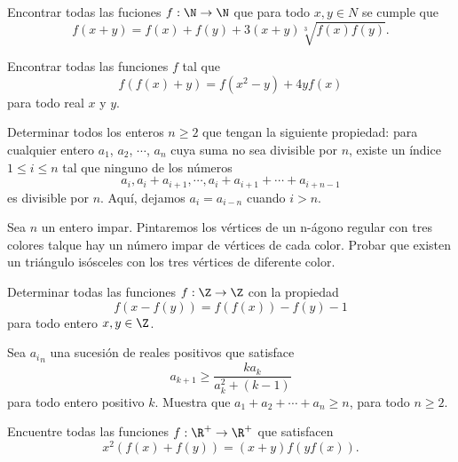 \begin{section-problem}
    Encontrar todas las fuciones $f: \N \rightarrow \N$ que para todo $x,y \in N$ se cumple que
    \[f(x + y) = f(x) + f(y) + 3(x + y)\sqrt[3]{f(x)f(y)}.\]
\end{section-problem}

\begin{section-problem}
    Encontrar todas las funciones $f$ tal que
    \[f(f(x) + y) = f(x^2 - y) + 4yf(x)\]
    para todo real $x$ y $y$.
\end{section-problem}

\begin{section-problem}
    Determinar todos los enteros $n \geq 2$ que tengan la siguiente propiedad:
    para cualquier entero $a_1$, $a_2$, $\cdots$, $a_n$ cuya suma no sea divisible por $n$, existe un índice $1 \leq i \leq n$ tal que ninguno de los números
    \[a_i, a_i + a_{i + 1}, \cdots, a_i + a_{i + 1} + \cdots + a_{i + n - 1}\]
    es divisible por $n$.
    Aquí, dejamos $a_i = a_{i - n}$ cuando $i > n$.
\end{section-problem}

\begin{section-problem}
    Sea $n$ un entero impar.
    Pintaremos los vértices de un n-ágono regular con tres colores talque hay un número impar de vértices de cada color.
    Probar que existen un triángulo isósceles con los tres vértices de diferente color.
\end{section-problem}

\begin{section-problem}
    Determinar todas las funciones $f: \Z \rightarrow \Z$ con la propiedad
    \[f(x - f(y)) = f(f(x)) - f(y) - 1\]
    para todo entero $x, y \in \Z$.
\end{section-problem}

\begin{section-problem}
    Sea ${a_i}_{n}$ una sucesión de reales positivos que satisface
    \[a_{k + 1} \geq \frac{k a_k}{a_k^2 + (k - 1)}\]
    para todo entero positivo $k$.
    Muestra que $a_1 + a_2 + \cdots + a_n \geq n$, para todo $n \geq 2$.
\end{section-problem}

\begin{section-problem}
    Encuentre todas las funciones $f: \R^{+} \rightarrow \R^{+}$ que satisfacen
    \[x^2(f(x) + f(y)) = (x + y)f(yf(x)).\]
\end{section-problem}

